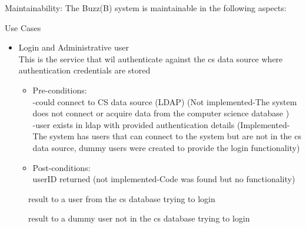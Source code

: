 \item Maintainability:
The Buzz(B) system is maintainable in the following aspects:
\item Use Cases
\begin {itemize}
\item {Login and Administrative user}\\
This is the service that wil authenticate against the cs data source where authentication credentials are stored
\begin {itemize}
\item Pre-conditions:\\
-could connect to CS data source (LDAP) (Not implemented-The system does not connect or acquire data from the 			computer science database )\\
        -user exists in ldap with provided authentication details (Implemented-The system has users that can connect to the system but are not 		in the cs data source, dummy users were created to provide the login 				functionality)\\
\item Post-conditions:\\
userID returned (not implemented-Code was found but no functionality)  
\end {itemize}
\end {itemize}
\begin{figure}[h!]
  \centering
  \caption{result to a user from the cs database trying to login }
\end{figure}
\begin{figure}[h!]
  \centering
  \caption{result to a dummy user not in the cs database trying to login }
\end{figure}

